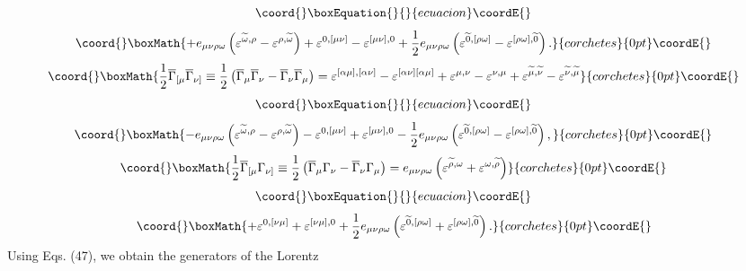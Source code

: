 \documentclass[a4paper,12pt]{article}
\begin{document}
\vspace{-8mm}
\begin{equation}\coord{}\boxEquation{  \label{97}
}{  }{ecuacion}\coordE{}\end{equation}
\vspace{-8mm}
\[\coord{}\boxMath{
+e_{\mu \nu \rho \omega }\left(\varepsilon ^{\widetilde{\omega
},\rho} - \varepsilon ^{\rho,\widetilde{\omega }}\right) +
\varepsilon ^{0,[\mu\nu]}-\varepsilon ^{[\mu\nu],0} +
\frac{1}{2}e_{\mu\nu\rho\omega}\left(\varepsilon^{\widetilde{0},
[\rho\omega]} -\varepsilon^{[\rho\omega],\widetilde{0}}\right) .
}{corchetes}{0pt}\coordE{}\]
\[\coord{}\boxMath{
\frac{1}{2}\overline{\Gamma }_{[\mu} \overline{\Gamma }_{\nu
]}\equiv\frac{1}{2}\left(\overline{\Gamma }_\mu \overline{\Gamma
}_\nu -\overline{\Gamma }_\nu \overline{\Gamma
}_\mu\right)=\varepsilon ^{[\alpha\mu],[\alpha\nu]}- \varepsilon
^{[\alpha\nu][ \alpha\mu]} +\varepsilon ^{\mu,\nu}-\varepsilon
^{\nu,\mu} + \varepsilon^{\widetilde{\mu},\widetilde{\nu}} -
\varepsilon^{\widetilde{\nu},\widetilde{\mu}}
}{corchetes}{0pt}\coordE{}\]
\vspace{-8mm}
\begin{equation}\coord{}\boxEquation{  \label{98}
}{  }{ecuacion}\coordE{}\end{equation}
\vspace{-8mm}
\[\coord{}\boxMath{
-e_{\mu \nu \rho \omega }\left(\varepsilon ^{\widetilde{\omega
},\rho} - \varepsilon ^{\rho,\widetilde{\omega }}\right) -
\varepsilon ^{0,[\mu\nu]}+\varepsilon ^{[\mu\nu],0} -
\frac{1}{2}e_{\mu\nu\rho\omega}\left(\varepsilon^{\widetilde{0},
[\rho\omega]} -\varepsilon^{[\rho\omega],\widetilde{0}}\right) ,
}{corchetes}{0pt}\coordE{}\]
\[\coord{}\boxMath{
\frac{1}{2}\overline{\Gamma }_{[\mu} \Gamma _{\nu
]}\equiv\frac{1}{2}\left(\overline{\Gamma }_\mu \Gamma _\nu
-\overline{\Gamma} _\nu \Gamma _\mu\right)= e_{\mu \nu \rho \omega
}\left(\varepsilon ^{\widetilde{\rho},\omega } + \varepsilon
^{\omega,\widetilde{\rho}}\right)
}{corchetes}{0pt}\coordE{}\]
\vspace{-8mm}
\begin{equation}\coord{}\boxEquation{  \label{99}
}{  }{ecuacion}\coordE{}\end{equation}
\vspace{-8mm}
\[\coord{}\boxMath{
 + \varepsilon ^{0,[\nu \mu]}+\varepsilon ^{[\nu \mu],0} +
\frac{1}{2}e_{\mu\nu\rho\omega}\left(\varepsilon^{\widetilde{0},
[\rho\omega]} +\varepsilon^{[\rho\omega],\widetilde{0}}\right) .
}{corchetes}{0pt}\coordE{}\]
Using Eqs. (47), we obtain the generators of the Lorentz
\end{document}
